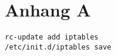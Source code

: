 \chapter*{Anhang A}
\label{chap:appA}

\begin{lstlisting}
rc-update add iptables 
/etc/init.d/iptables save
\end{lstlisting}



